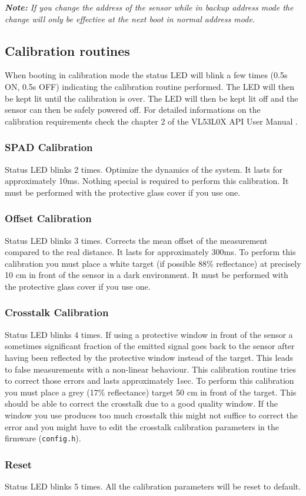 \textit{\textbf{Note:} If you change the \iic address of the sensor while in backup address mode the change will only be effective at the next boot in normal \iic address mode.}

\subsection{Calibration routines}
When booting in calibration mode the status LED will blink a few times (0.5s ON, 0.5s OFF) indicating the calibration routine performed. The LED will then be kept lit until the calibration is over. The LED will then be kept lit off and the sensor can then be safely powered off. For detailed informations on the calibration requirements check the chapter 2 of the VL53L0X API User Manual \cite{tofAPI}.

\subsubsection{SPAD Calibration}
Status LED blinks 2 times. Optimize the dynamics of the system. It lasts for approximately 10ms. Nothing special is required to perform this calibration. It must be performed with the protective glass cover if you use one.

\subsubsection{Offset Calibration}
Status LED blinks 3 times. Corrects the mean offset of the measurement compared to the real distance. It lasts for approximately 300ms. To perform this calibration you must place a white target (if possible 88\% reflectance) at precisely 10 cm in front of the sensor in a dark environment. It must be performed with the protective glass cover if you use one.

\subsubsection{Crosstalk Calibration}
Status LED blinks 4 times.
If using a protective window in front of the sensor a sometimes significant fraction of the emitted signal goes back to the sensor after having been reflected by the protective window instead of the target. This leads to false measurements with a non-linear behaviour.
This calibration routine tries to correct those errors and lasts approximately 1sec. To perform this calibration you must place a grey (17\% reflectance) target 50 cm in front of the target. This should be able to correct the crosstalk due to a good quality window. If the window you use produces too much crosstalk this might not suffice to correct the error and you might have to edit the crosstalk calibration parameters in the firmware (\texttt{config.h}).


\subsubsection{Reset}
Status LED blinks 5 times.
All the calibration parameters will be reset to default.
